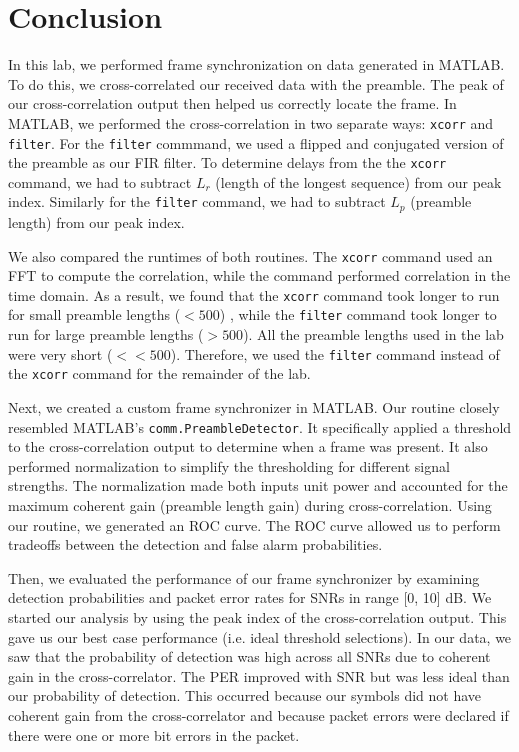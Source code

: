 \documentclass{article}
\begin{document}
\section{Conclusion}

In this lab, we performed frame synchronization on data generated in MATLAB. To do this, we cross-correlated our received data with the preamble. The peak of our cross-correlation output then helped us correctly locate the frame. In MATLAB, we performed the cross-correlation in two separate ways: \texttt{xcorr} and \texttt{filter}. For the \texttt{filter} commmand, we used a flipped and conjugated version of the preamble as our FIR filter. To determine delays from the the \texttt{xcorr} command, we had to subtract $L_r$ (length of the longest sequence) from our peak index. Similarly for the \texttt{filter} command, we had to subtract $L_p$ (preamble length) from our peak index.

We also compared the runtimes of both routines. The \texttt{xcorr} command used an FFT to compute the correlation, while the  command performed correlation in the time domain. As a result, we found that the \texttt{xcorr} command took longer to run for small preamble lengths ($ < 500$) , while the \texttt{filter} command took longer to run for large preamble lengths ($ > 500$). All the preamble lengths used in the lab were very short ($ << 500$). Therefore, we used the \texttt{filter} command instead of the \texttt{xcorr} command for the remainder of the lab.

Next, we created a custom frame synchronizer in MATLAB. Our routine closely resembled MATLAB's \texttt{comm.PreambleDetector}. It specifically applied a threshold to the cross-correlation output to determine when a frame was present. It also performed normalization to simplify the thresholding for different signal strengths. The normalization made both inputs unit power and accounted for the maximum coherent gain (preamble length gain) during cross-correlation. Using our routine, we generated an ROC curve. The ROC curve allowed us to perform tradeoffs between the detection and false alarm probabilities.

Then, we evaluated the performance of our frame synchronizer by examining detection probabilities and packet error rates for SNRs in range [0, 10] dB. We started our analysis by using the peak index of the cross-correlation output. This gave us our best case performance (i.e. ideal threshold selections). In our data, we saw that the probability of detection was high across all SNRs due to coherent gain in the cross-correlator. The PER improved with SNR but was less ideal than our probability of detection. This occurred because our symbols did not have coherent gain from the cross-correlator and because packet errors were declared if there were one or more bit errors in the packet.
\end{document}
